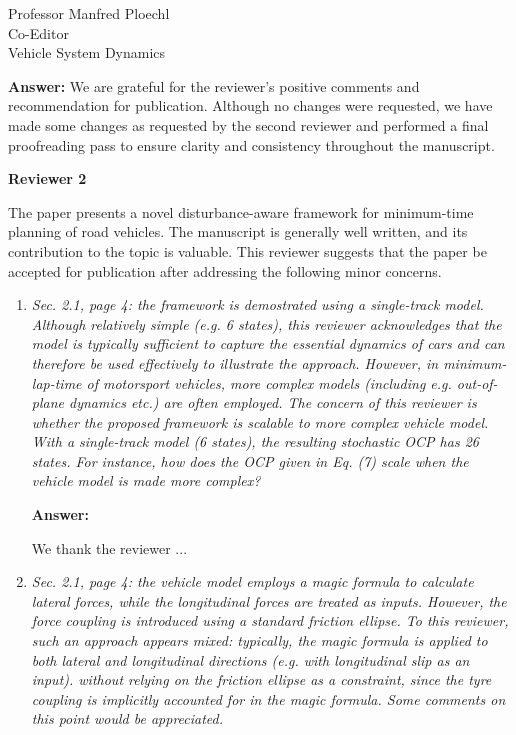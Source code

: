 \documentclass{letter}
\begin{document}
\begin{letter}{Professor Manfred Ploechl\\
Co-Editor\\
Vehicle System Dynamics}
\begin{enumerate}
\vspace{2mm}

\textbf{Answer:} We are grateful for the reviewer's positive comments and recommendation for publication. Although no changes were requested, we have made some changes as requested by the second reviewer and performed a final proofreading pass to ensure clarity and consistency throughout the manuscript.

\hrulefill
\end{enumerate}

\textbf{Reviewer 2}

The paper presents a novel disturbance-aware framework for minimum-time planning of road vehicles.
The manuscript is generally well written, and its contribution to the topic is valuable.
This reviewer suggests that the paper be accepted for publication after addressing the following minor concerns.

\begin{enumerate}

\item
\textit{Sec. 2.1, page 4: the framework is demostrated using a single-track model. Although relatively simple (e.g. 6 states), this reviewer acknowledges that the model is typically sufficient to capture the essential dynamics of cars and can therefore be used effectively to illustrate the approach. However, in minimum-lap-time of motorsport vehicles, more complex models (including e.g. out-of-plane dynamics etc.) are often employed. The concern of this reviewer is whether the proposed framework is scalable to more complex vehicle model. With a single-track model (6 states), the resulting stochastic OCP has 26 states. For instance, how does the OCP given in Eq. (7) scale when the vehicle model is made more complex?
}

\vspace{2mm}

\textbf{Answer:}

We thank the reviewer ...

\hrulefill

\item
\textit{Sec. 2.1, page 4: the vehicle model employs a magic formula to calculate lateral forces, while the longitudinal forces are treated as inputs. However, the force coupling is introduced using a standard friction ellipse. To this reviewer, such an approach appears mixed: typically, the magic formula is applied to both lateral and longitudinal directions (e.g. with longitudinal slip as an input). without relying on the friction ellipse as a constraint, since the tyre coupling is implicitly accounted for in the magic formula. Some comments on this point would be appreciated.}


\end{enumerate}
\end{letter}
\end{document}
